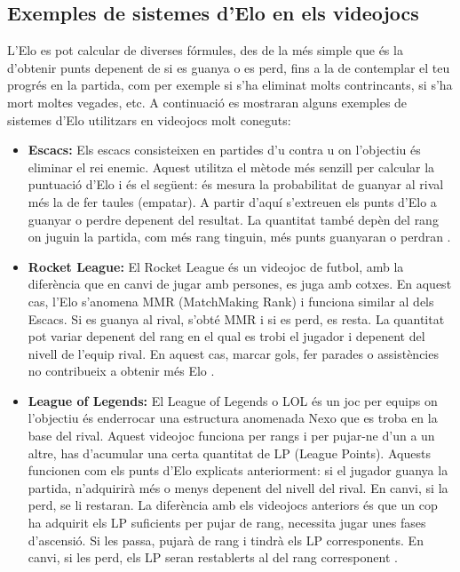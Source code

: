 \documentclass[a4paper]{article}
\begin{document}
\newpage
\subsection{Exemples de sistemes d'Elo en els videojocs}
L'Elo es pot calcular de diverses fórmules, des de la més simple que és la d'obtenir punts depenent de si es guanya o es perd, fins a la de contemplar el teu progrés en la partida, com per exemple si s'ha eliminat molts contrincants, si s'ha mort moltes vegades, etc. A continuació es mostraran alguns exemples de sistemes d'Elo utilitzars en videojocs molt coneguts:

\begin{itemize}
    \item \textbf{Escacs:} Els escacs consisteixen en partides d'u contra u on l'objectiu és eliminar el rei enemic. Aquest utilitza el mètode més senzill per calcular la puntuació d'Elo i és el següent: és mesura la probabilitat de guanyar al rival més la de fer taules (empatar). A partir d'aquí s'extreuen els punts d'Elo a guanyar o perdre depenent del resultat. La quantitat també depèn del rang on juguin la partida, com més rang tinguin, més punts guanyaran o perdran \cite{wikipediaElo}.
    \item \textbf{Rocket League:} El Rocket League és un videojoc de futbol, amb la diferència que en canvi de jugar amb persones, es juga amb cotxes. En aquest cas, l'Elo s'anomena MMR (MatchMaking Rank) i funciona similar al dels Escacs. Si es guanya al rival, s'obté MMR i si es perd, es resta. La quantitat pot variar depenent del rang en el qual es trobi el jugador i depenent del nivell de l'equip rival. En aquest cas, marcar gols, fer parades o assistències no contribueix a obtenir més Elo \cite{rocketElo}.
    \item \textbf{League of Legends:} El League of Legends o LOL és un joc per equips on l'objectiu és enderrocar una estructura anomenada Nexo que es troba en la base del rival. Aquest videojoc funciona per rangs i per pujar-ne d'un a un altre, has d'acumular una certa quantitat de LP (League Points). Aquests funcionen com els punts d'Elo explicats anteriorment: si el jugador guanya la partida, n'adquirirà més o menys depenent del nivell del rival. En canvi, si la perd, se li restaran. La diferència amb els videojocs anteriors és que un cop ha adquirit els LP suficients per pujar de rang, necessita jugar unes fases d'ascensió. Si les passa, pujarà de rang i tindrà els LP corresponents. En canvi, si les perd, els LP seran restablerts al del rang corresponent \cite{LolElo}.

\end{itemize}
\end{document}
